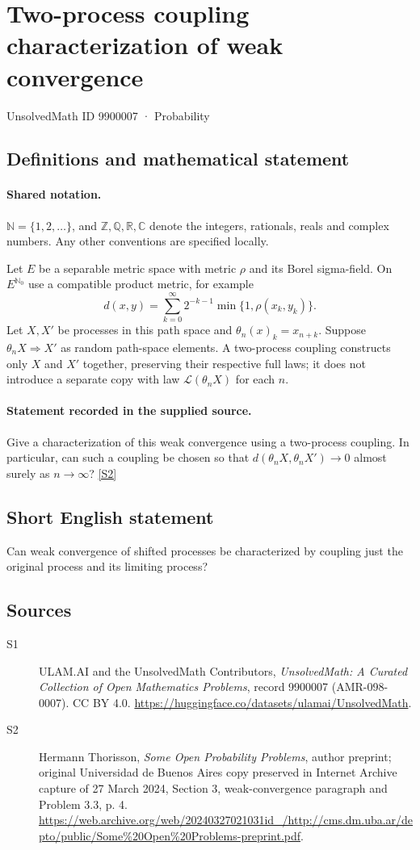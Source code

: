 \documentclass[11pt]{article}
\newcommand{\sref}[2]{\hyperlink{source:#1:#2}{[S#2]}}
\begin{document}
\setcounter{section}{9900006}
\section{Two-process coupling characterization of weak convergence}\label{9900007}
{\small\sffamily UnsolvedMath ID 9900007 · Probability}
\subsection{Definitions and mathematical statement}

\paragraph{Shared notation.}$\mathbb N=\{1,2,\ldots\}$, and $\mathbb Z,\mathbb Q,\mathbb R,\mathbb C$ denote the integers, rationals, reals and complex numbers. Any other conventions are specified locally.


Let $E$ be a separable metric space with metric $\rho$ and its Borel sigma-field. On $E^{\mathbb N_0}$ use a compatible product metric, for example
\[d(x,y)=\sum_{k=0}^\infty2^{-k-1}\min\{1,\rho(x_k,y_k)\}.\]
Let $X,X'$ be processes in this path space and $\theta_n(x)_k=x_{n+k}$. Suppose $\theta_nX\Rightarrow X'$ as random path-space elements. A two-process coupling constructs only $X$ and $X'$ together, preserving their respective full laws; it does not introduce a separate copy with law $\mathcal L(\theta_nX)$ for each $n$.
\paragraph{Statement recorded in the supplied source.}
Give a characterization of this weak convergence using a two-process coupling. In particular, can such a coupling be chosen so that $d(\theta_nX,\theta_nX')\to0$ almost surely as $n\to\infty$? \sref{9900007}{2}
\subsection{Short English statement}
Can weak convergence of shifted processes be characterized by coupling just the original process and its limiting process?
\subsection{Sources}
\begin{description}
\item[\hypertarget{source:9900007:1}{S1}] ULAM.AI and the UnsolvedMath Contributors, \emph{UnsolvedMath: A Curated Collection of Open Mathematics Problems}, record 9900007 (AMR-098-0007). CC BY 4.0. \url{https://huggingface.co/datasets/ulamai/UnsolvedMath}.
\item[\hypertarget{source:9900007:2}{S2}] Hermann Thorisson, \emph{Some Open Probability Problems}, author preprint; original Universidad de Buenos Aires copy preserved in Internet Archive capture of 27 March 2024, Section 3, weak-convergence paragraph and Problem 3.3, p. 4. \url{https://web.archive.org/web/20240327021031id_/http://cms.dm.uba.ar/depto/public/Some%20Open%20Problems-preprint.pdf}.
\end{description}
\label{end:9900007}
\end{document}
